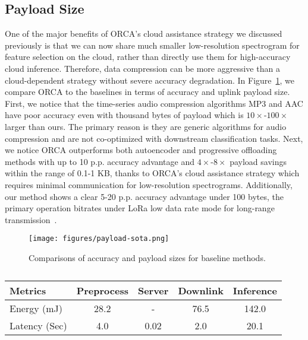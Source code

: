 \subsection{Payload Size}
\label{sec:payload-size}

One of the major benefits of ORCA's cloud assistance strategy we discussed previously is that we can now share much smaller low-resolution spectrogram for feature selection on the cloud, rather than directly use them for high-accuracy cloud inference. Therefore, data compression can be more aggressive than a cloud-dependent strategy without severe accuracy degradation. In Figure~\ref{fig:system-payload}, we compare ORCA to the baselines in terms of accuracy and uplink payload size. First, we notice that the time-series audio compression algorithms MP3 and AAC have poor accuracy even with thousand bytes of payload which is $10\times$-$100\times$ larger than ours. The primary reason is they are generic algorithms for audio compression and are not co-optimized with downstream classification tasks. Next, we notice ORCA outperforms both autoencoder and progressive offloading methods with up to 10 p.p. accuracy advantage and $4\times$-$8\times$ payload savings within the range of 0.1-1 KB, thanks to ORCA's cloud assistance strategy which requires minimal communication for low-resolution spectrograms. Additionally, our method shows a clear 5-20 p.p. accuracy advantage under 100 bytes, the primary operation bitrates under LoRa low data rate mode for long-range transmission~\cite{Semtech2016LoRaWAN}. 

\begin{figure}[tp]
    \centering
    \texttt{[image: figures/payload-sota.png]}
    \vspace{-0.3cm}
    \caption{Comparisons of accuracy and payload sizes for baseline methods.}
    \label{fig:system-payload}
    \vspace{-0.3cm}
\end{figure}



\begin{table}[tp]
    \caption{}
    \centering
    \begin{tabular}{lcccc}
    \hline 
    Metrics & Preprocess & Server & Downlink & Inference  \\
    \hline
    Energy (mJ) & 28.2 & - & 76.5  & 142.0  \\
    Latency (Sec) & 4.0 & 0.02 & 2.0 & 20.1  \\
    \hline
    \end{tabular}
    \label{tab:energy-latency}
    \vspace{-0.3cm}
\end{table}

